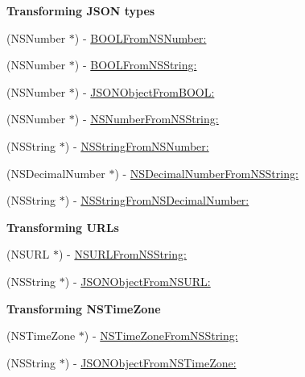 \begin{Indent}\textbf{ Transforming J\+S\+ON types}\par
\begin{DoxyCompactItemize}
\item 
(N\+S\+Number $\ast$) -\/ \mbox{\hyperlink{interface_o_p_t_l_y_j_s_o_n_value_transformer_a2d5951123bdc1165237f533c7200f9f7}{B\+O\+O\+L\+From\+N\+S\+Number\+:}}
\item 
(N\+S\+Number $\ast$) -\/ \mbox{\hyperlink{interface_o_p_t_l_y_j_s_o_n_value_transformer_ae565407052a7ec2d2abcab67bd95f65d}{B\+O\+O\+L\+From\+N\+S\+String\+:}}
\item 
(N\+S\+Number $\ast$) -\/ \mbox{\hyperlink{interface_o_p_t_l_y_j_s_o_n_value_transformer_a2b4a7ada8467e6adca9c60623f53f4eb}{J\+S\+O\+N\+Object\+From\+B\+O\+O\+L\+:}}
\item 
(N\+S\+Number $\ast$) -\/ \mbox{\hyperlink{interface_o_p_t_l_y_j_s_o_n_value_transformer_a6db84db78c906d7a8f34c80bf09e3c7d}{N\+S\+Number\+From\+N\+S\+String\+:}}
\item 
(N\+S\+String $\ast$) -\/ \mbox{\hyperlink{interface_o_p_t_l_y_j_s_o_n_value_transformer_a4044652aaf83fbbe927b0b21e895ce20}{N\+S\+String\+From\+N\+S\+Number\+:}}
\item 
(N\+S\+Decimal\+Number $\ast$) -\/ \mbox{\hyperlink{interface_o_p_t_l_y_j_s_o_n_value_transformer_a9c0418c26d16c434ef5a83513b160323}{N\+S\+Decimal\+Number\+From\+N\+S\+String\+:}}
\item 
(N\+S\+String $\ast$) -\/ \mbox{\hyperlink{interface_o_p_t_l_y_j_s_o_n_value_transformer_ad3e6a8cc2d919b417fd547afcb9cb0f2}{N\+S\+String\+From\+N\+S\+Decimal\+Number\+:}}
\end{DoxyCompactItemize}
\end{Indent}
\begin{Indent}\textbf{ Transforming U\+R\+Ls}\par
\begin{DoxyCompactItemize}
\item 
(N\+S\+U\+RL $\ast$) -\/ \mbox{\hyperlink{interface_o_p_t_l_y_j_s_o_n_value_transformer_a248bf63376f69fba336eb0ba4b420bc3}{N\+S\+U\+R\+L\+From\+N\+S\+String\+:}}
\item 
(N\+S\+String $\ast$) -\/ \mbox{\hyperlink{interface_o_p_t_l_y_j_s_o_n_value_transformer_a6185fb38d2aa228324f93cf89006685a}{J\+S\+O\+N\+Object\+From\+N\+S\+U\+R\+L\+:}}
\end{DoxyCompactItemize}
\end{Indent}
\begin{Indent}\textbf{ Transforming N\+S\+Time\+Zone}\par
\begin{DoxyCompactItemize}
\item 
(N\+S\+Time\+Zone $\ast$) -\/ \mbox{\hyperlink{interface_o_p_t_l_y_j_s_o_n_value_transformer_a8bc2b1ca2845b275c0a0d6662af137d0}{N\+S\+Time\+Zone\+From\+N\+S\+String\+:}}
\item 
(N\+S\+String $\ast$) -\/ \mbox{\hyperlink{interface_o_p_t_l_y_j_s_o_n_value_transformer_a07a6938053e8b7fece1dc888fdc02fc9}{J\+S\+O\+N\+Object\+From\+N\+S\+Time\+Zone\+:}}
\end{DoxyCompactItemize}
\end{Indent}
